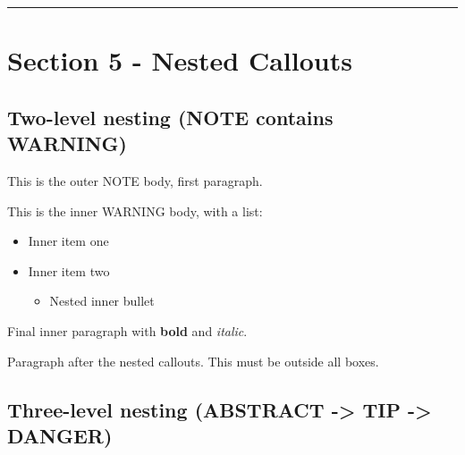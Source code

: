 \begin{tcolorbox}[breakable,colback=ocGryBack,colframe=ocGryFrame,coltitle=ocGryTitle,left=3mm,boxed title style={left=1mm},title={\hspace*{-2.5mm}\iconInfo\; md2pdf - inner without explicit \texttt{shift-heading=0}}]
\begin{center}\rule{0.5\linewidth}{0.5pt}\end{center}

\section*{Section 5 - Nested
Callouts}\label{inner-2-section-5---nested-callouts}

\subsection*{Two-level nesting (NOTE contains
WARNING)}\label{inner-2-two-level-nesting-note-contains-warning}

\begin{tcolorbox}[breakable,colback=ocGryBack,colframe=ocGryFrame,coltitle=ocGryTitle,left=3mm,boxed title style={left=1mm},title={\hspace*{-2.5mm}\iconNote\; Outer NOTE title}]

This is the outer NOTE body, first paragraph.

\begin{tcolorbox}[breakable,colback=ocOrgBack,colframe=ocOrgFrame,coltitle=ocOrgTitle,left=3mm,boxed title style={left=1mm},title={\hspace*{-2.5mm}\iconWarning\; Inner WARNING title}]

This is the inner WARNING body, with a list:

\begin{itemize}
\tightlist
\item
  Inner item one
\item
  Inner item two

  \begin{itemize}
  \tightlist
  \item
    Nested inner bullet
  \end{itemize}
\end{itemize}

Final inner paragraph with \textbf{bold} and \emph{italic}.

\end{tcolorbox}

\end{tcolorbox}

Paragraph after the nested callouts. This must be outside all boxes.

\subsection*{Three-level nesting (ABSTRACT -\textgreater{} TIP
-\textgreater{}
DANGER)}\label{inner-2-three-level-nesting-abstract---tip---danger}


\end{tcolorbox}
